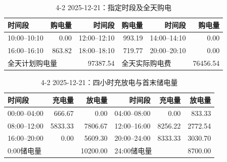 \FloatBarrier
\begin{table}[htbp]\centering\scriptsize
\caption{4-2 2025-12-21：指定时段及全天购电}
\begin{tabular}{lrrrrr}\toprule
时间段 & 购电量 & 时间段 & 购电量 & 时间段 & 购电量\\\midrule
10:00--10:10 & 0.00 & 12:00--12:10 & 993.19 & 14:00--14:10 & 0.00\\
16:00--16:10 & 863.82 & 18:00--18:10 & 719.77 & 20:00--20:10 & 0.00\\
\multicolumn{2}{l}{全天计划购电量} & 97387.54 & \multicolumn{2}{l}{全天实际购电费} & 76456.54\\
\bottomrule\end{tabular}\end{table}

\begin{table}[htbp]\centering\scriptsize
\caption{4-2 2025-12-21：四小时充放电与首末储电量}
\begin{tabular}{lrrrrr}\toprule
时间段 & 充电量 & 放电量 & 时间段 & 充电量 & 放电量\\\midrule
00:00--04:00 & 666.67 & 0.00 & 04:00--08:00 & 0.00 & 833.33\\
08:00--12:00 & 5833.33 & 7806.67 & 12:00--16:00 & 8256.22 & 2772.54\\
16:00--20:00 & 0.00 & 5609.30 & 20:00--24:00 & 8333.33 & 3030.70\\
\multicolumn{2}{l}{0:00储电量} & 10200.00 & \multicolumn{2}{l}{24:00储电量} & 8700.00\\
\bottomrule\end{tabular}\end{table}

